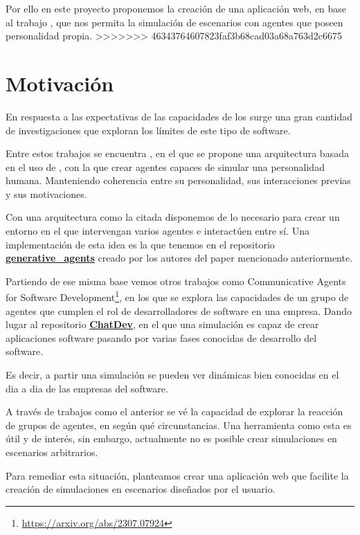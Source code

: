  Por ello en este proyecto proponemos la creación de una aplicación web, en base al trabajo \ga, que nos permita la simulación de escenarios con agentes que poseen personalidad propia. 
>>>>>>> 46343764607823faf3b68cad03a68a763d2c6675

\section{Motivación}
En respuesta a las expectativas de las capacidades de los \mgl surge una gran cantidad de investigaciones que exploran los límites de este tipo de software.

Entre estos trabajos se encuentra \ga, en el que se propone una arquitectura basada en el uso de \mgl, con la que crear agentes capaces de simular una personalidad humana. Manteniendo coherencia entre su personalidad, sus interacciones previas y sus motivaciones.

Con una arquitectura como la citada disponemos de lo necesario para crear un entorno en el que intervengan varios agentes e interactúen entre sí. Una implementación de esta idea es la que tenemos en el repositorio \href{https://github.com/joonspk-research/generative_agents}{\textbf{generative\_agents}} creado por los autores del paper mencionado anteriormente.

Partiendo de ese misma base vemos otros trabajos como Communicative Agents for Software Development\footnote{\url{https://arxiv.org/abs/2307.07924}}, en los que se explora las capacidades de un grupo de agentes que cumplen el rol de desarrolladores de software en una empresa. Dando lugar al repositorio \href{https://github.com/OpenBMB/ChatDev}{\textbf{ChatDev}}, en el que una simulación es capaz de crear aplicaciones software pasando por varias fases conocidas de desarrollo del software.

Es decir, a partir una simulación se pueden ver dinámicas bien conocidas en el dia a dia de las empresas del software.

A través de trabajos como el anterior se vé la capacidad de explorar la reacción de grupos de agentes, en según qué circunstancias.
Una herramienta como esta es útil y de interés, sin embargo, actualmente no es posible crear simulaciones en escenarios arbitrarios.

Para remediar esta situación, planteamos crear una aplicación web que facilite la creación de simulaciones en escenarios diseñados por el usuario.

